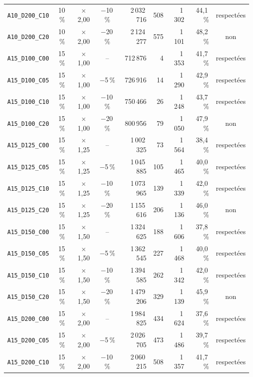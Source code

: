 {\begin{longtable}{lcccrrrrc}
\texttt{A10\_D200\_C10} & 10\,\% & $\times$2{,}00 & $-$10\,\% & 2\,032\,716 & 508 & 1\,302 & 44{,}1\,\% & respectées \\
\texttt{A10\_D200\_C20} & 10\,\% & $\times$2{,}00 & $-$20\,\% & 2\,124\,277 & 575 & 1\,101 & 48{,}2\,\% & non \\
\texttt{A15\_D100\_C00} & 15\,\% & $\times$1{,}00 & -- & 712\,876 & 4 & 1\,353 & 41{,}7\,\% & respectées \\
\texttt{A15\_D100\_C05} & 15\,\% & $\times$1{,}00 & $-$5\,\% & 726\,916 & 14 & 1\,290 & 42{,}9\,\% & respectées \\
\texttt{A15\_D100\_C10} & 15\,\% & $\times$1{,}00 & $-$10\,\% & 750\,466 & 26 & 1\,248 & 43{,}7\,\% & respectées \\
\texttt{A15\_D100\_C20} & 15\,\% & $\times$1{,}00 & $-$20\,\% & 800\,956 & 79 & 1\,050 & 47{,}9\,\% & non \\
\texttt{A15\_D125\_C00} & 15\,\% & $\times$1{,}25 & -- & 1\,002\,325 & 73 & 1\,564 & 38{,}4\,\% & respectées \\
\texttt{A15\_D125\_C05} & 15\,\% & $\times$1{,}25 & $-$5\,\% & 1\,045\,885 & 105 & 1\,465 & 40{,}0\,\% & respectées \\
\texttt{A15\_D125\_C10} & 15\,\% & $\times$1{,}25 & $-$10\,\% & 1\,073\,965 & 139 & 1\,339 & 42{,}0\,\% & respectées \\
\texttt{A15\_D125\_C20} & 15\,\% & $\times$1{,}25 & $-$20\,\% & 1\,155\,616 & 206 & 1\,136 & 46{,}0\,\% & non \\
\texttt{A15\_D150\_C00} & 15\,\% & $\times$1{,}50 & -- & 1\,324\,625 & 188 & 1\,606 & 37{,}8\,\% & respectées \\
\texttt{A15\_D150\_C05} & 15\,\% & $\times$1{,}50 & $-$5\,\% & 1\,362\,545 & 227 & 1\,468 & 40{,}0\,\% & respectées \\
\texttt{A15\_D150\_C10} & 15\,\% & $\times$1{,}50 & $-$10\,\% & 1\,394\,585 & 262 & 1\,342 & 42{,}0\,\% & respectées \\
\texttt{A15\_D150\_C20} & 15\,\% & $\times$1{,}50 & $-$20\,\% & 1\,479\,206 & 329 & 1\,139 & 45{,}9\,\% & non \\
\texttt{A15\_D200\_C00} & 15\,\% & $\times$2{,}00 & -- & 1\,984\,825 & 434 & 1\,624 & 37{,}6\,\% & respectées \\
\texttt{A15\_D200\_C05} & 15\,\% & $\times$2{,}00 & $-$5\,\% & 2\,026\,705 & 473 & 1\,486 & 39{,}7\,\% & respectées \\
\texttt{A15\_D200\_C10} & 15\,\% & $\times$2{,}00 & $-$10\,\% & 2\,060\,215 & 508 & 1\,357 & 41{,}7\,\% & respectées \\

\end{longtable}}
